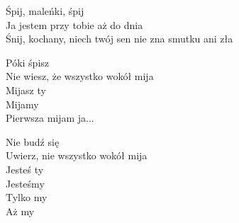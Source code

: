 \begin{text}
    Śpij, maleńki, śpij\\
    Ja jestem przy tobie aż do dnia\\
    Śnij, kochany, niech twój sen nie zna smutku ani zła

    Póki śpisz\\
    Nie wiesz, że wszystko wokół mija\\
    Mijasz ty\\
    Mijamy\\
    Pierwsza mijam ja...

    Nie budź się\\
    Uwierz, nie wszystko wokół mija\\
    Jesteś ty\\
    Jesteśmy\\
    Tylko my\\
    Aż my
\end{text}
\begin{chord}

\end{chord}